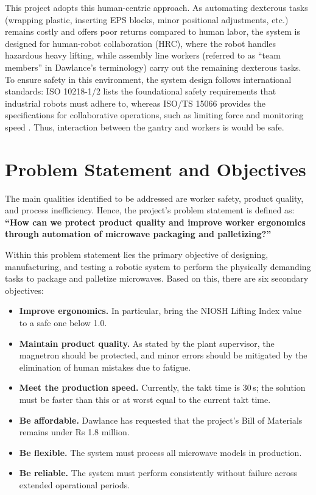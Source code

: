 This project adopts this human-centric approach. As automating dexterous tasks (wrapping plastic, inserting EPS blocks, minor positional adjustments, etc.) remains costly and offers poor returns compared to human labor, the system is designed for human-robot collaboration (HRC), where the robot handles hazardous heavy lifting, while assembly line workers (referred to as ``team members'' in Dawlance's terminology) carry out the remaining dexterous tasks. To ensure safety in this environment, the system design follows international standards: ISO 10218-1/2 lists the foundational safety requirements that industrial robots must adhere to, whereas ISO/TS 15066 provides the specifications for collaborative operations, such as limiting force and monitoring speed \cite{iso15066}. Thus, interaction between the gantry and workers is would be safe.

\section{Problem Statement and Objectives}
The main qualities identified to be addressed are worker safety, product quality, and process inefficiency. Hence, the project's problem statement is defined as: \textbf{``How can we protect product quality and improve worker ergonomics through automation of microwave packaging and palletizing?''}

Within this problem statement lies the primary objective of designing, manufacturing, and testing a robotic system to perform the physically demanding tasks to package and palletize microwaves. Based on this, there are six secondary objectives:

\begin{itemize}
    \item \textbf{Improve ergonomics.} In particular, bring the NIOSH Lifting Index value to a safe one below 1.0.
    \item \textbf{Maintain product quality.} As stated by the plant supervisor, the magnetron should be protected, and minor errors should be mitigated by the elimination of human mistakes due to fatigue.
    \item \textbf{Meet the production speed.} Currently, the takt time is 30\,s; the solution must be faster than this or at worst equal to the current takt time.
    \item \textbf{Be affordable.} Dawlance has requested that the project's Bill of Materials remains under Rs 1.8 million.
    \item \textbf{Be flexible.} The system must process all microwave models in production.
    \item \textbf{Be reliable.} The system must perform consistently without failure across extended operational periods.
\end{itemize}
